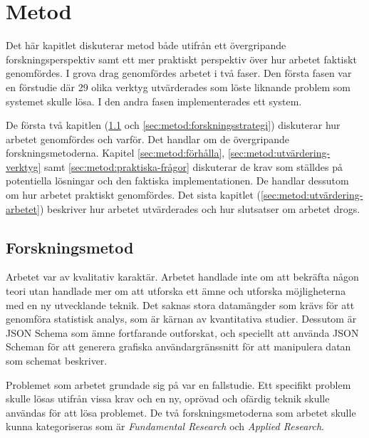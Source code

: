 \chapter{Metod}
\label{sec:metod}

Det här kapitlet diskuterar metod både utifrån ett övergripande forskningsperspektiv samt ett mer praktiskt perspektiv över hur arbetet faktiskt genomfördes. I grova drag genomfördes arbetet i två faser. Den första fasen var en förstudie där 29 olika verktyg utvärderades som löste liknande problem som systemet skulle lösa. I den andra fasen implementerades ett system.

De första två kapitlen (\ref{sec:metod:forskningsmetod} och \ref{sec:metod:forskningsstrategi}) diskuterar hur arbetet genomfördes och varför. Det handlar om de övergripande forskningsmetoderna. Kapitel \ref{sec:metod:förhålla}, \ref{sec:metod:utvärdering-verktyg} samt \ref{sec:metod:praktiska-frågor} diskuterar de krav som ställdes på potentiella lösningar och den faktiska implementationen. De handlar dessutom om hur arbetet praktiskt genomfördes. Det sista kapitlet (\ref{sec:metod:utvärdering-arbetet}) beskriver hur arbetet utvärderades och hur slutsatser om arbetet drogs.

\section{Forskningsmetod}
\label{sec:metod:forskningsmetod}
Arbetet var av kvalitativ karaktär. Arbetet handlade inte om att bekräfta någon teori utan handlade mer om att utforska ett ämne och utforska möjligheterna med en ny utvecklande teknik. Det saknas stora datamängder som krävs för att genomföra statistisk analys, som är kärnan av kvantitativa studier. Dessutom är JSON Schema som ämne fortfarande outforskat, och speciellt att använda JSON Scheman för att generera grafiska användargränssnitt för att manipulera datan som schemat beskriver.


Problemet som arbetet grundade sig på var en fallstudie. Ett specifikt problem skulle lösas utifrån vissa krav och en ny, oprövad och ofärdig teknik skulle användas för att lösa problemet. De två forskningsmetoderna som arbetet skulle kunna kategoriseras som är \textit{Fundamental Research} och \textit{Applied Research}.


